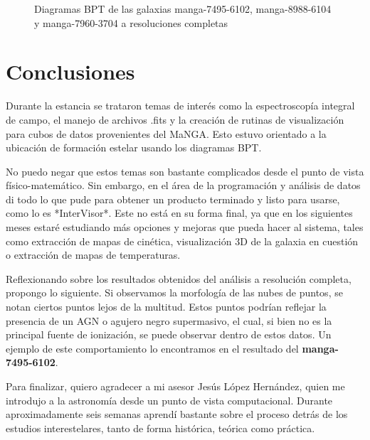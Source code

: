 \documentclass[10pt,twocolumn,a4paper]{opticajnl}
\begin{document}
\begin{figure}[h!]
    \caption{Diagramas BPT de las galaxias manga-7495-6102, manga-8988-6104 y manga-7960-3704 a resoluciones completas}
    \label{fig:recent_files}
\end{figure}

\section*{Conclusiones}
Durante la estancia se trataron temas de interés como la espectroscopía integral de campo, el manejo de archivos .fits y la creación de rutinas de visualización para cubos de datos provenientes del MaNGA. Esto estuvo orientado a la ubicación de formación estelar usando los diagramas BPT.

No puedo negar que estos temas son bastante complicados desde el punto de vista físico-matemático. Sin embargo, en el área de la programación y análisis de datos di todo lo que pude para obtener un producto terminado y listo para usarse, como lo es *InterVisor*. Este no está en su forma final, ya que en los siguientes meses estaré estudiando más opciones y mejoras que pueda hacer al sistema, tales como extracción de mapas de cinética, visualización 3D de la galaxia en cuestión o extracción de mapas de temperaturas.

Reflexionando sobre los resultados obtenidos del análisis a resolución completa, propongo lo siguiente. Si observamos la morfología de las nubes de puntos, se notan ciertos puntos lejos de la multitud. Estos puntos podrían reflejar la presencia de un AGN o agujero negro supermasivo, el cual, si bien no es la principal fuente de ionización, se puede observar dentro de estos datos. Un ejemplo de este comportamiento lo encontramos en el resultado del \textbf{manga-7495-6102}.

Para finalizar, quiero agradecer a mi asesor Jesús López Hernández, quien me introdujo a la astronomía desde un punto de vista computacional. Durante aproximadamente seis semanas aprendí bastante sobre el proceso detrás de los estudios interestelares, tanto de forma histórica, teórica como práctica.
\end{document}
